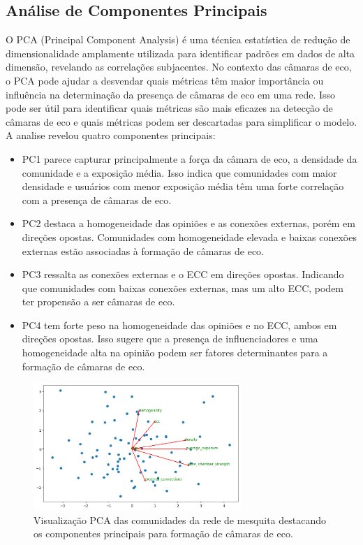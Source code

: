 \subsection{Análise de Componentes Principais}

O PCA (Principal Component Analysis) é uma técnica estatística de redução de dimensionalidade amplamente utilizada para identificar padrões em dados de alta dimensão, revelando as correlações subjacentes. No contexto das câmaras de eco, o PCA pode ajudar a desvendar quais métricas têm maior importância ou influência na determinação da presença de câmaras de eco em uma rede. Isso pode ser útil para identificar quais métricas são mais eficazes na detecção de câmaras de eco e quais métricas podem ser descartadas para simplificar o modelo. A analise revelou quatro componentes principais:

\begin{itemize}
	\item PC1 parece capturar principalmente a força da câmara de eco, a densidade da comunidade e a exposição média. Isso indica que comunidades com maior densidade e usuários com menor exposição média têm uma forte correlação com a presença de câmaras de eco.
	\item PC2 destaca a homogeneidade das opiniões e as conexões externas, porém em direções opostas. Comunidades com homogeneidade elevada e baixas conexões externas estão associadas à formação de câmaras de eco.
	\item PC3 ressalta as conexões externas e o ECC em direções opostas. Indicando que comunidades com baixas conexões externas, mas um alto ECC, podem ter propensão a ser câmaras de eco.
	\item PC4 tem forte peso na homogeneidade das opiniões e no ECC, ambos em direções opostas. Isso sugere que a presença de influenciadores e uma homogeneidade alta na opinião podem ser fatores determinantes para a formação de câmaras de eco.
\end{itemize}

\begin{figure}[htb]
	\centering
	\includegraphics[width=0.7\textwidth]{images/mesquita_pca.png}
	\caption{Visualização PCA das comunidades da rede de mesquita destacando os componentes principais para formação de câmaras de eco.}
	\label{fig:mesquita_pca}
\end{figure}

